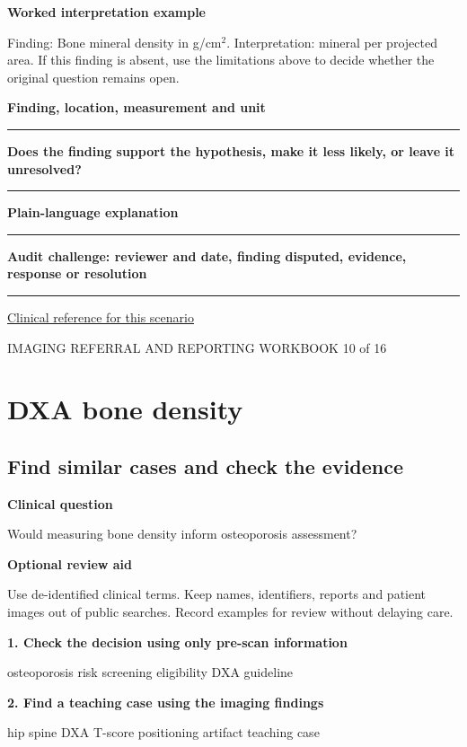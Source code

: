 \documentclass[11pt,a4paper]{article}
\newcommand{\record}[1]{\textbf{#1}\par\vspace{0.55\baselineskip}\hrule\vspace{0.35\baselineskip}}
\begin{document}
\textbf{Worked interpretation example}\par Finding: Bone mineral density in g/cm$^2$. Interpretation: mineral per projected area. If this finding is absent, use the limitations above to decide whether the original question remains open.\par

\record{Finding, location, measurement and unit}

\record{Does the finding support the hypothesis, make it less likely, or leave it unresolved?}

\record{Plain-language explanation}

\record{Audit challenge: reviewer and date, finding disputed, evidence, response or resolution}

\small\href{https://www.uspreventiveservicestaskforce.org/uspstf/recommendation/osteoporosis-screening}{Clinical reference for this scenario}

\normalsize

\newpage

{\small IMAGING REFERRAL AND REPORTING WORKBOOK \hfill 10 of 16}

\section*{DXA bone density}

\subsection*{Find similar cases and check the evidence}

\textbf{Clinical question}\par Would measuring bone density inform osteoporosis assessment?\par

\textbf{Optional review aid}\par Use de-identified clinical terms. Keep names, identifiers, reports and patient images out of public searches. Record examples for review without delaying care.\par

\textbf{1. Check the decision using only pre-scan information}\par osteoporosis risk screening eligibility DXA guideline\par

\textbf{2. Find a teaching case using the imaging findings}\par hip spine DXA T-score positioning artifact teaching case\par
\end{document}
